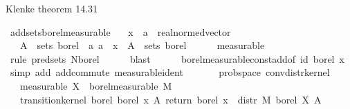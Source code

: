 \begin{isabellebody}
\begin{isamarkuptext}%
Klenke theorem 14.31%
\end{isamarkuptext}\isamarkuptrue%
\isamarkupfalse%
\ add{\isacharunderscore}{\kern0pt}sets{\isacharunderscore}{\kern0pt}borel{\isacharbrackleft}{\kern0pt}measurable{\isacharbrackright}{\kern0pt}{\isacharcolon}{\kern0pt}\isanewline
\ \ \ x\ {\isacharcolon}{\kern0pt}{\isacharcolon}{\kern0pt}\ {\isachardoublequoteopen}{\isacharprime}{\kern0pt}a\ {\isacharcolon}{\kern0pt}{\isacharcolon}{\kern0pt}\ real{\isacharunderscore}{\kern0pt}normed{\isacharunderscore}{\kern0pt}vector{\isachardoublequoteclose}\isanewline
\ \ \ {\isachardoublequoteopen}A{\isacharprime}{\kern0pt}\ {\isasymin}\ sets\ borel\ {\isasymLongrightarrow}\ {\isacharbraceleft}{\kern0pt}a{\isachardot}{\kern0pt}\ a\ {\isacharplus}{\kern0pt}\ x\ {\isasymin}\ A{\isacharprime}{\kern0pt}{\isacharbraceright}{\kern0pt}\ {\isasymin}\ sets\ borel{\isachardoublequoteclose}\isanewline
%
\isadelimproof
\ \ \ \ %
\endisadelimproof
%
\isatagproof
{}\isamarkupfalse%
\ measurable\isanewline
\ \ \ \ \isamarkupfalse%
\ {\isacharparenleft}{\kern0pt}rule\ pred{\isacharunderscore}{\kern0pt}sets{}{\isacharbrackleft}{\kern0pt}\ N{\isacharequal}{\kern0pt}borel{\isacharbrackright}{\kern0pt}{\isacharparenright}{\kern0pt}\isanewline
\ \ \ \ \isamarkupfalse%
\ blast\isanewline
\ \ \ \ \isamarkupfalse%
\ borel{\isacharunderscore}{\kern0pt}measurable{\isacharunderscore}{\kern0pt}const{\isacharunderscore}{\kern0pt}add{\isacharbrackleft}{\kern0pt}of\ id\ borel\ x{\isacharbrackright}{\kern0pt}\ \isamarkupfalse%
\ {\isacharparenleft}{\kern0pt}simp\ add{\isacharcolon}{\kern0pt}\ add{\isachardot}{\kern0pt}commute\ measurable{\isacharunderscore}{\kern0pt}ident{\isacharparenright}{\kern0pt}\isanewline
\ \ \ \ \isamarkupfalse%
%
\endisatagproof
{\isafoldproof}%
%
\isadelimproof
\isanewline
%
\endisadelimproof
\isanewline
{}\isamarkupfalse%
\ {\isacharparenleft}{\kern0pt}\ prob{\isacharunderscore}{\kern0pt}space{\isacharparenright}{\kern0pt}\ conv{\isacharunderscore}{\kern0pt}distr{\isacharunderscore}{\kern0pt}kernel{\isacharcolon}{\kern0pt}\isanewline
\ \ \ {\isacharbrackleft}{\kern0pt}measurable{\isacharbrackright}{\kern0pt}{\isacharcolon}{\kern0pt}\ {\isachardoublequoteopen}X\ {\isasymin}\ borel{\isacharunderscore}{\kern0pt}measurable\ M{\isachardoublequoteclose}\isanewline
\ \ \ {\isachardoublequoteopen}transition{\isacharunderscore}{\kern0pt}kernel\ borel\ borel\ {\isacharparenleft}{\kern0pt}{\isasymlambda}x\ A{\isacharprime}{\kern0pt}{\isachardot}{\kern0pt}\ {\isacharparenleft}{\kern0pt}{\isacharparenleft}{\kern0pt}return\ borel\ x{\isacharparenright}{\kern0pt}\ {\isasymstar}\ {\isacharparenleft}{\kern0pt}distr\ M\ borel\ X{\isacharparenright}{\kern0pt}{\isacharparenright}{\kern0pt}\ A{\isacharprime}{\kern0pt}{\isacharparenright}{\kern0pt}{\isachardoublequoteclose}\isanewline

\end{isabellebody}
